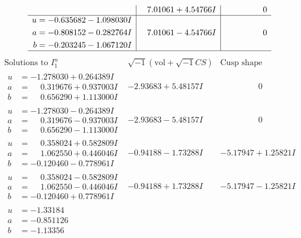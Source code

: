 \documentclass[1p]{elsarticle_modified}
\theoremstyle{definition}
\newcommand{\I}{\sqrt{-1}}
\begin{document}
$$\begin{array}{c|c|c}
 & \phantom{-}7.01061 + 4.54766 I & \phantom{-0.000000 } 0 \\ \hline\begin{aligned}
u &= -0.635682 - 1.098030 I \\
a &= -0.808152 - 0.282764 I \\
b &= -0.203245 - 1.067120 I\end{aligned}
 & \phantom{-}7.01061 - 4.54766 I & \phantom{-0.000000 } 0\\
 \hline 
 \end{array}$$\newpage$$\begin{array}{c|c|c}  
\text{Solutions to }I^u_{1}& \I (\text{vol} + \sqrt{-1}CS) & \text{Cusp shape}\\
 \hline 
\begin{aligned}
u &= -1.278030 + 0.264389 I \\
a &= \phantom{-}0.319676 + 0.937003 I \\
b &= \phantom{-}0.656290 + 1.113000 I\end{aligned}
 & -2.93683 + 5.48157 I & \phantom{-0.000000 } 0 \\ \hline\begin{aligned}
u &= -1.278030 - 0.264389 I \\
a &= \phantom{-}0.319676 - 0.937003 I \\
b &= \phantom{-}0.656290 - 1.113000 I\end{aligned}
 & -2.93683 - 5.48157 I & \phantom{-0.000000 } 0 \\ \hline\begin{aligned}
u &= \phantom{-}0.358024 + 0.582809 I \\
a &= \phantom{-}1.062550 + 0.446046 I \\
b &= -0.120460 - 0.778961 I\end{aligned}
 & -0.94188 - 1.73288 I & -5.17947 + 1.25821 I \\ \hline\begin{aligned}
u &= \phantom{-}0.358024 - 0.582809 I \\
a &= \phantom{-}1.062550 - 0.446046 I \\
b &= -0.120460 + 0.778961 I\end{aligned}
 & -0.94188 + 1.73288 I & -5.17947 - 1.25821 I \\ \hline\begin{aligned}
u &= -1.33184\phantom{ +0.000000I} \\
a &= -0.851126\phantom{ +0.000000I} \\
b &= -1.13356\phantom{ +0.000000I}\end{aligned}

\end{array}$$
\end{document}
